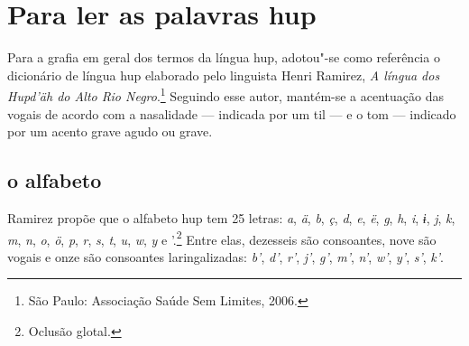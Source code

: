 \chapter{Para ler as palavras hup}

Para a grafia em geral dos termos da língua hup, adotou"-se como
referência o dicionário de língua hup elaborado pelo linguista Henri
Ramirez, \textit{A língua dos Hupd'äh do Alto Rio Negro}.\footnote{São Paulo: Associação Saúde
Sem Limites, 2006.} Seguindo esse autor, mantém-se a acentuação
das vogais de acordo com a nasalidade --- indicada por um til --- e o tom --- indicado por um acento grave agudo ou grave.

\section{o alfabeto}

Ramirez propõe que o alfabeto hup tem 25 letras: \textit{a}, \textit{ä}, \textit{b}, \textit{ç}, \textit{d}, \textit{e}, \textit{ë}, \textit{g},
\textit{h}, \textit{i}, \textit{ɨ}, \textit{j}, \textit{k}, \textit{m}, \textit{n}, \textit{o}, \textit{ö}, \textit{p}, \textit{r}, \textit{s}, \textit{t}, \textit{u}, \textit{w}, \textit{y} e '.\footnote{Oclusão
glotal.} Entre elas, dezesseis são consoantes, nove são vogais e onze são consoantes
laringalizadas: \textit{b'}, \textit{d'}, \textit{r'}, \textit{j'}, \textit{g'}, \textit{m'}, \textit{n'}, \textit{w'}, \textit{y'}, \textit{s'}, \textit{k'}.

